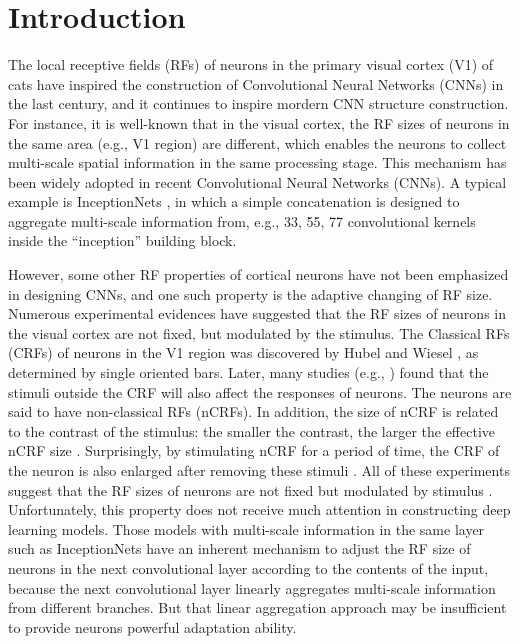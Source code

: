 \documentclass[10pt,twocolumn,letterpaper]{article}
\begin{document}
\section{Introduction}
	The local receptive fields (RFs) of neurons in the primary visual cortex (V1) of cats \cite{hubel1962receptive} have inspired the construction of Convolutional Neural Networks (CNNs) \cite{lecun1989backpropagation} in the last century, and it continues to inspire mordern CNN structure construction. For instance, it is well-known that in the visual cortex, the RF sizes of neurons in the same area (e.g., V1 region) are different, which enables the neurons to collect multi-scale spatial information in the same processing stage. This mechanism has been widely adopted in recent Convolutional Neural Networks (CNNs). A typical example is InceptionNets \cite{szegedy2015going,ioffe2015batch,szegedy2016rethinking,szegedy2017inception}, in which a simple concatenation is designed to aggregate multi-scale information from, e.g., 33, 55, 77 convolutional kernels inside the ``inception'' building block.
	
	However, some other RF properties of cortical neurons have not been emphasized in designing CNNs, and one such property is the adaptive changing of RF size. Numerous experimental evidences have suggested that the RF sizes of neurons in the visual cortex are not fixed, but modulated by the stimulus. The Classical RFs (CRFs) of neurons in the V1 region was discovered by Hubel and Wiesel \cite{hubel1962receptive}, as determined by single oriented bars. Later, many studies (e.g., \cite{nelson1978orientation}) found that the stimuli outside the CRF will also affect the responses of neurons. The neurons are said to have non-classical RFs (nCRFs). In addition, the size of nCRF is related to the contrast of the stimulus: the smaller the contrast, the larger the effective nCRF size \cite{sceniak1999contrast}. Surprisingly, by stimulating nCRF for a period of time, the CRF of the neuron is also enlarged after removing these stimuli \cite{pettet1992dynamic}. All of these experiments suggest that the RF sizes of neurons are not fixed but modulated by stimulus \cite{spillmann2015beyond}. Unfortunately, this property does not receive  much attention in constructing deep learning models. {Those models with multi-scale information in the same layer such as InceptionNets have an inherent mechanism to adjust the RF size of neurons in the next convolutional layer according to the contents of the input, because the next convolutional layer linearly aggregates multi-scale information from different branches. But that linear aggregation approach may be insufficient to provide neurons powerful adaptation ability. }
\end{document}
